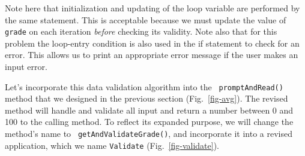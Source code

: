 \noindent Note here that initialization and updating of the loop
variable are performed by the same statement. This is acceptable
because we must update the value of {\tt grade} on each iteration {\it
before} checking its validity. Note also that for this problem the
loop-entry condition is also used in the if statement to check for an
error.  This allows us to print an appropriate error message if the
user makes an input error.

Let's incorporate this data validation algorithm into the {\tt
prompt\-And\-Read()} method that we designed in the previous section
(Fig.~\ref{fig-avg}). The revised method will handle and validate all
input and return a number between 0 and 100 to the calling method. To
reflect its expanded purpose, we will change the method's name to {\tt
getAndValidateGrade()}, and incorporate it into a revised application,
which we name {\tt Validate} (Fig.~\ref{fig-validate}).

